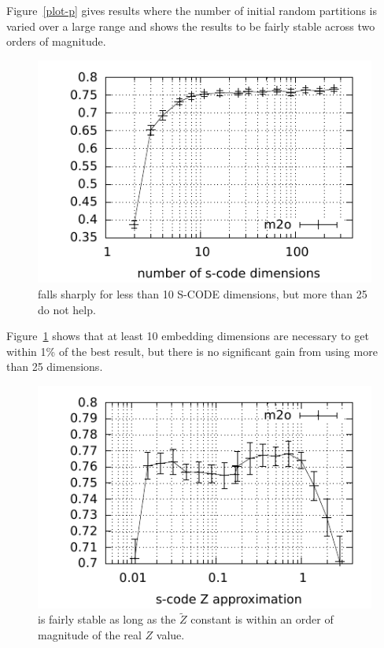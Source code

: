 Figure~\ref{plot-p} gives results where the number of initial random
partitions is varied over a large range and shows the results to be
fairly stable across two orders of magnitude.

\begin{figure}[ht] \centering
\includegraphics[width=\linewidth]{plot-d.pdf}
\caption{\mto falls sharply for less than 10 S-CODE dimensions, but
  more than 25 do not help.}
\label{plot-d}
\end{figure}

Figure~\ref{plot-d} shows that at least 10 embedding dimensions are
necessary to get within 1\% of the best result, but there is no
significant gain from using more than 25 dimensions.

\begin{figure}[ht] \centering
\includegraphics[width=\linewidth]{plot-z.pdf}
\caption{\mto is fairly stable as long as the $\tilde{Z}$ constant is
  within an order of magnitude of the real $Z$ value.}
\label{plot-z}
\end{figure}

